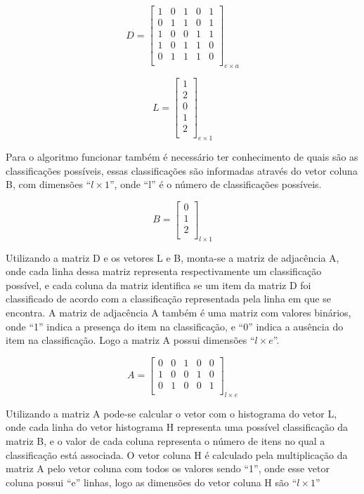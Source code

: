 \begin{anexosenv}
$$D=\left[
\begin{array}{ccccc}
1 & 0 & 1 & 0 & 1 \\
0 & 1 & 1 & 0 & 1 \\
1 & 0 & 0 & 1 & 1 \\
1 & 0 & 1 & 1 & 0 \\
0 & 1 & 1 & 1 & 0 \\
\end{array}
\right]_{e \times a}$$

$$L=\left[
\begin{array}{c}
1 \\
2 \\
0 \\
1 \\
2 \\
\end{array}
\right]_{e \times 1}$$

Para o algoritmo funcionar também é necessário ter conhecimento de quais são as
classificações possíveis, essas classificações são informadas
através do vetor coluna B, com dimensões ``${l \times 1}$'', onde ``l'' é o número
de classificações possíveis.

$$B=\left[
\begin{array}{c}
0 \\
1 \\
2 \\
\end{array}
\right]_{l \times 1}$$

Utilizando a matriz D e os vetores L e B, monta-se a matriz de adjacência A, onde
cada linha dessa matriz representa respectivamente um classificação possível, e cada
coluna da matriz identifica se um item da matriz D foi classificado de acordo
com a classificação representada pela linha em que se encontra. A matriz de adjacência A também é uma
matriz com valores binários, onde ``1'' indica a presença do item na classificação,
e ``0'' indica a ausência do item na classificação. Logo a matriz A possui
dimensões ``${l \times e}$''.

$$A=\left[
\begin{array}{ccccc}
0 & 0 & 1 & 0 & 0 \\
1 & 0 & 0 & 1 & 0 \\
0 & 1 & 0 & 0 & 1 \\
\end{array}
\right]_{l \times e}$$

Utilizando a matriz A pode-se calcular o vetor com o histograma do vetor L, onde
cada linha do vetor histograma H representa uma possível
classificação da matriz B, e o valor de cada coluna representa o número de itens
no qual a classificação está associada. O vetor coluna H é calculado pela multiplicação da matriz A pelo
vetor coluna com todos os valores sendo ``1'', onde esse vetor coluna possui ``e''
linhas, logo as dimensões do vetor coluna H são ``${l \times 1}$''


\end{anexosenv}
